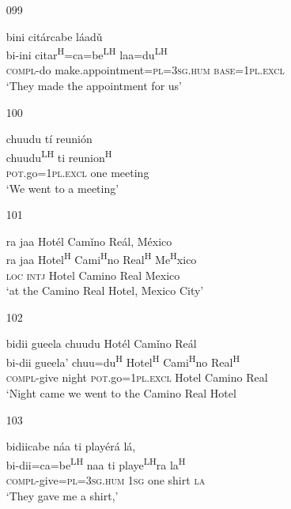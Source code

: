 \begin{itemize}
\item[099]
 
\glll   bini cit\'{a}rcabe l\'{a}ad\v{u} \\
bi-ini citar\textsuperscript{H}=ca=be\textsuperscript{LH}  laa=du\textsuperscript{LH}  \\
\textsc{compl}-do make.appointment=\textsc{pl}=\textsc{3sg.hum} \textsc{base}=\textsc{1pl.excl} \\
\glt `They made the appointment for us' 
 


\item[100]
 
\glll   chuudu t\'{i} reuni\'{o}n \\
chuudu\textsuperscript{LH}  ti reunion\textsuperscript{H}  \\
\textsc{pot}.go=\textsc{1pl.excl} one meeting \\
\glt `We went to a meeting'
 

\item[101]
 
\glll   ra jaa Hot\'{e}l Cam\v{i}no Re\'{a}l, M\'{e}xico \\
 ra jaa Hotel\textsuperscript{H} Cami\textsuperscript{H}no Real\textsuperscript{H} Me\textsuperscript{H}xico \\
 \textsc{loc} \textsc{intj} Hotel Camino Real Mexico \\
\glt `at the Camino Real Hotel, Mexico City'
 


\item[102]

\glll   bidii gueela chuudu Hot\'{e}l Cam\v{i}no Re\'{a}l  \\
 bi-dii gueela' chuu=du\textsuperscript{H} Hotel\textsuperscript{H} Cami\textsuperscript{H}no Real\textsuperscript{H} \\ 
 \textsc{compl}-give night  \textsc{pot}.go=\textsc{1pl.excl} Hotel Camino Real  \\
\glt `Night came we went to the Camino Real Hotel
 

\item[103]
 
\glll   bidiicabe n\'{a}a ti play\'{e}r\'{a} l\'{a}, \\
bi-dii=ca=be\textsuperscript{LH} naa ti playe\textsuperscript{LH}ra la\textsuperscript{H} \\
 \textsc{compl}-give=\textsc{pl}=\textsc{3sg.hum} \textsc{1sg} one shirt \textsc{la} \\
\glt `They gave me a shirt,'
 



\end{itemize}
